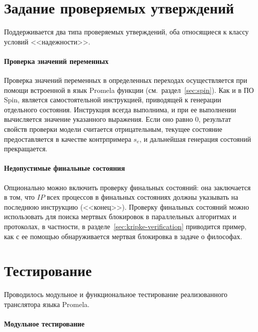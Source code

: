 \section{Задание проверяемых утверждений}
\label{sec:assertions}

Поддерживается два типа проверяемых утверждений, оба относящиеся к классу условий
<<надежности>>.

\paragraph{Проверка значений переменных}

Проверка значений переменных в определенных переходах осуществляется при помощи встроенной
в язык Promela функции  (см.~раздел~\ref{sec:spin}). Как и в ПО Spin,
 является самостоятельной инструкцией, приводящей к генерации отдельного
состояния. Инструкция  всегда выполнима, и при ее выполнении вычисляется
значение указанного выражения. Если оно равно $0$, результат свойств проверки модели
считается отрицательным, текущее состояние предоставляется в качестве контрпримера $s_e$,
и дальнейшая генерация состояний прекращается.

\paragraph{Недопустимые финальные состояния}

Опционально можно включить проверку финальных состояний: она заключается в том, что $IP$
всех процессов в финальных состояниях должны указывать на последнюю инструкцию
(<<конец>>). Проверку финальных состояний можно использовать для поиска мертвых блокировок
в параллельных алгоритмах и протоколах, в частности, в разделе~\ref{sec:kripke-verification}
приводится пример, как с ее помощью обнаруживается мертвая блокировка в задаче о
философах.

\section{Тестирование}
\label{sec:pmlparse-testing}

Проводилось модульное и функциональное тестирование реализованного транслятора языка
Promela.

\paragraph{Модульное тестирование}

